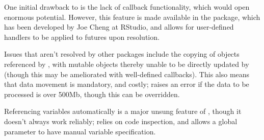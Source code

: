 One initial drawback to  is the lack of callback functionality, which would open enormous potential.
However, this feature is made available in the  package, which has been developed by Joe Cheng at RStudio, and allows for user-defined handlers to be applied to futures upon resolution\cite{cheng2021promises}.

Issues that aren't resolved by other packages include the copying of objects referenced by , with mutable objects thereby unable to be directly updated by  (though this may be ameliorated with well-defined callbacks).
This also means that data movement is mandatory, and costly;  raises an error if the data to be processed is over 500Mb, though this can be overridden.

Referencing variables automatically is a major unsung feature of , though it doesn't always work reliably;  relies on code inspection, and allows a global parameter to have manual variable specification.
